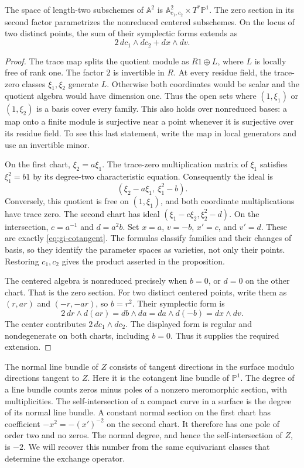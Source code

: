 \begin{proposition}\label{prop:gi-hilbert-chart}
The space of length-two subschemes of $\mathbb A^2$ is
$\mathbb A^2_{c_1,c_2}\times T^*\mathbb P^1$.
The zero section in its second factor parametrizes the nonreduced centered subschemes.
On the locus of two distinct points, the sum of their symplectic forms extends as
\[
 2\,dc_1\wedge dc_2+dx\wedge dv.
\]
\end{proposition}
\begin{proof}
The trace map splits the quotient module as $R1\oplus L$, where $L$ is locally free of rank one.
The factor $2$ is invertible in $R$.
At every residue field, the trace-zero classes $\xi_1,\xi_2$ generate $L$.
Otherwise both coordinates would be scalar and the quotient algebra would have dimension one.
Thus the open sets where $(1,\xi_1)$ or $(1,\xi_2)$ is a basis cover every family.
This also holds over nonreduced bases: a map onto a finite module is surjective near a point whenever it is surjective over its residue field.
To see this last statement, write the map in local generators and use an invertible minor.

On the first chart, $\xi_2=a\xi_1$.
The trace-zero multiplication matrix of $\xi_1$ satisfies $\xi_1^2=b1$ by its degree-two characteristic equation.
Consequently the ideal is
\[
 (\xi_2-a\xi_1,\ \xi_1^2-b).
\]
Conversely, this quotient is free on $(1,\xi_1)$, and both coordinate multiplications have trace zero.
The second chart has ideal $(\xi_1-c\xi_2,\xi_2^2-d)$.
On the intersection, $c=a^{-1}$ and $d=a^2b$.
Set $x=a$, $v=-b$, $x'=c$, and $v'=d$.
These are exactly \eqref{eq:gi-cotangent}.
The formulas classify families and their changes of basis, so they identify the parameter spaces as varieties, not only their points.
Restoring $c_1,c_2$ gives the product asserted in the proposition.

The centered algebra is nonreduced precisely when $b=0$, or $d=0$ on the other chart.
That is the zero section.
For two distinct centered points, write them as $(r,ar)$ and $(-r,-ar)$, so $b=r^2$.
Their symplectic form is
\[
 2\,dr\wedge d(ar)=db\wedge da=da\wedge d(-b)=dx\wedge dv.
\]
The center contributes $2\,dc_1\wedge dc_2$.
The displayed form is regular and nondegenerate on both charts, including $b=0$.
Thus it supplies the required extension.
\end{proof}

The normal line bundle of $Z$ consists of tangent directions in the surface modulo directions tangent to $Z$.
Here it is the cotangent line bundle of $\mathbb P^1$.
The degree of a line bundle counts zeros minus poles of a nonzero meromorphic section, with multiplicities.
The self-intersection of a compact curve in a surface is the degree of its normal line bundle.
A constant normal section on the first chart has coefficient $-x^2=-(x')^{-2}$ on the second chart.
It therefore has one pole of order two and no zeros.
The normal degree, and hence the self-intersection of $Z$, is $-2$.
We will recover this number from the same equivariant classes that determine the exchange operator.

